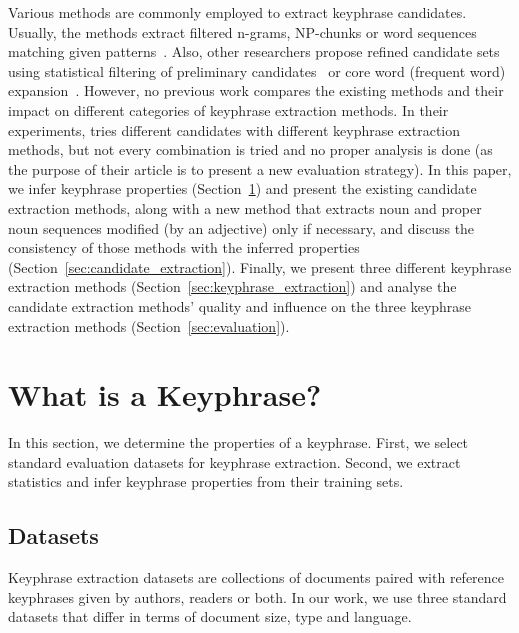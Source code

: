   Various methods are commonly employed to extract keyphrase candidates.
  Usually, the methods extract filtered n-grams, NP-chunks or word sequences
  matching given patterns~\cite{hulth2003keywordextraction}. Also, other
  researchers propose refined candidate sets using statistical filtering of
  preliminary candidates~\cite{kim2009reexaminingautomatickeyphraseextraction}
  or core word (frequent word) expansion~\cite{you2009refinedcandidateset}.
  However, no previous work compares the existing methods and their impact on
  different categories of keyphrase extraction methods. In their experiments,
   tries different candidates with different
  keyphrase extraction methods, but not every combination is tried and no proper
  analysis is done (as the purpose of their article is to present a new
  evaluation strategy). In this paper, we infer keyphrase properties
  (Section~\ref{sec:definition_of_candidate_keyphrases}) and present the
  existing candidate extraction methods, along with a new method that extracts
  noun and proper noun sequences modified (by an adjective) only if necessary,
  and discuss the consistency of those methods with the inferred properties
  (Section~\ref{sec:candidate_extraction}). Finally, we present three different
  keyphrase extraction methods (Section~\ref{sec:keyphrase_extraction}) and
  analyse the candidate extraction methods' quality and influence on the three
  keyphrase extraction methods (Section~\ref{sec:evaluation}).


\section{What is a Keyphrase?}
\label{sec:definition_of_candidate_keyphrases}
  In this section, we determine the properties of a keyphrase. First, we select
  standard evaluation datasets for keyphrase extraction. Second, we extract
  statistics and infer keyphrase properties from their training sets.

  \subsection{Datasets}
  \label{subsec:keyphrase_extraction_datasets}
    Keyphrase extraction datasets are collections of documents paired with
    reference keyphrases given by authors, readers or both. In our work, we use
    three standard datasets that differ in terms of document size,  type and
    language.

